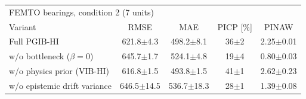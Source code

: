 \begin{tabular}{l c c c c}
\hline
\multicolumn{5}{l}{FEMTO bearings, condition 2 (7 units)}\\
 Variant & RMSE & MAE & PICP [\%] & PINAW \\
\hline
Full PGIB-HI & 621.8$\pm$4.3 & 498.2$\pm$8.1 & 36$\pm$2 & 2.25$\pm$0.01 \\
w/o bottleneck ($\beta=0$) & 645.7$\pm$1.7 & 524.1$\pm$4.8 & 19$\pm$4 & 0.80$\pm$0.03 \\
w/o physics prior (VIB-HI) & 616.8$\pm$1.5 & 493.8$\pm$1.5 & 41$\pm$1 & 2.62$\pm$0.23 \\
w/o epistemic drift variance & 646.5$\pm$14.5 & 536.7$\pm$18.3 & 28$\pm$1 & 1.39$\pm$0.08 \\
\hline
\end{tabular}

